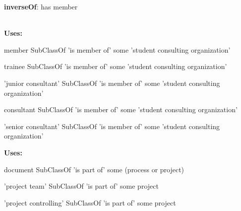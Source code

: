 \documentclass[a4paper, DIV=13, BCOR=0cm]{scrbook}
\begin{document}
\begin{mdframed}[style=onto, frametitle={is member of}]
	{%
		\begin{compactitem}
			\item \textbf{inverseOf}: has member
		\end{compactitem}
		\hrulefill\\
		\textbf{Uses:}
		\begin{compactitem}
			\item member SubClassOf 'is member of' some 'student consulting organization'
			\item trainee SubClassOf 'is member of' some 'student consulting organization'
			\item 'junior consultant' SubClassOf 'is member of' some 'student consulting organization'
			\item consultant SubClassOf 'is member of' some 'student consulting organization'
			\item 'senior consultant' SubClassOf 'is member of' some 'student consulting organization'
		\end{compactitem}
	} %
\end{mdframed}

\begin{mdframed}[style=onto, frametitle={is part of}]
	{%
		\textbf{Uses:}
		\begin{compactitem}
			\item document SubClassOf 'is part of' some 
			(process or project)
			\item 'project team' SubClassOf 'is part of' some project
			\item 'project controlling' SubClassOf 'is part of' some project
		\end{compactitem}
	} %
\end{mdframed}
\end{document}
